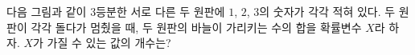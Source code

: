 다음 그림과 같이 $3$등분한 서로 다른 두 원판에 $1$, $2$, $3$의 숫자가 각각 적혀 있다. 두 원판이 각각 돌다가 멈췄을 때, 두 원판의 바늘이 가리키는 수의 합을 확률변수 $X$라 하자. $X$가 가질 수 있는 값의 개수는? 
\par\smallskip\begin{center}\resizebox{\ifdim\width>\linewidth\linewidth\else\width\fi}{!}{}\end{center}
